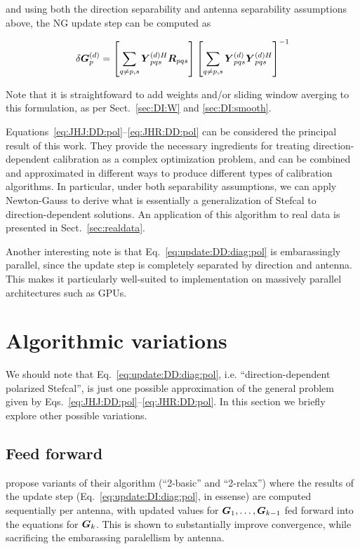 \documentclass[useAMS,usenatbib]{mn2e}
\newcommand{\mat}[1]{{\bmath{#1}}}
\newcommand{\RR}{\mat{R}}
\newcommand{\GG}{\mat{G}}
\begin{document}
and using both the direction separability and antenna separability assumptions above, the NG update step can be computed as

\begin{equation}
\label{eq:update:DD:diag:pol}
\delta \GGd_p = \left [ \sum\limits_{q\ne p,s} \YYdH_{pqs} \RR_{pqs} \right ] 
\left [ \sum\limits_{q\ne p,s} \YYd_{pqs} \YYdH_{pqs}  \right ]^{-1}
\end{equation}

Note that it is straightfoward to add weights and/or sliding window averging to this formulation, as per 
Sect.~\ref{sec:DI:W} and \ref{sec:DI:smooth}.

Equations~\ref{eq:JHJ:DD:pol}--\ref{eq:JHR:DD:pol} can be considered the principal result of this work.
They provide the necessary ingredients for treating direction-dependent calibration as a complex optimization 
problem, and can be combined and approximated in different ways to produce different types of calibration 
algorithms. In particular, under both separability assumptions, we can apply Newton-Gauss to derive what is essentially a generalization of 
Stefcal to direction-dependent solutions. An application of this algorithm to real data is presented in Sect.~\ref{sec:realdata}.

Another interesting note is that Eq.~\ref{eq:update:DD:diag:pol} is embarassingly parallel, since the update step is 
completely separated by direction and antenna. This makes it particularly well-suited to implementation on massively 
parallel architectures such as GPUs.

\section{Algorithmic variations}

We should note that Eq.~\ref{eq:update:DD:diag:pol}, i.e. ``direction-dependent polarized Stefcal'', is just one
possible approximation of the general problem given by Eqs.~\ref{eq:JHJ:DD:pol}--\ref{eq:JHR:DD:pol}. In this section
we briefly explore other possible variations.

\subsection{Feed forward}

\citet{Stefcal} propose variants of their algorithm (``2-basic'' and ``2-relax'') where the results of the 
update step (Eq.~\ref{eq:update:DI:diag:pol}, in essense) are computed sequentially per antenna, with updated
values for $\GG_1,\dots,\GG_{k-1}$ fed forward into the equations for $\GG_k$. This is shown to 
substantially improve convergence, while sacrificing the embarassing paralellism by antenna.
\end{document}
